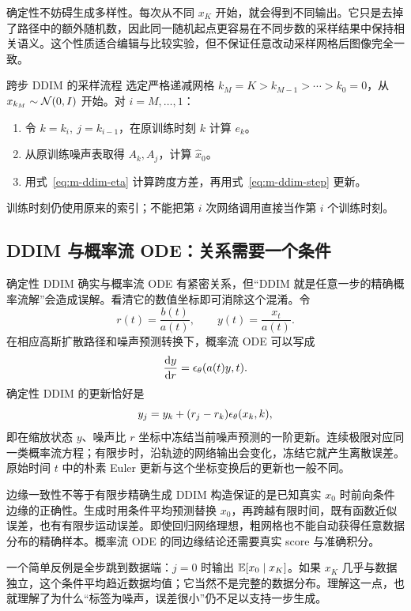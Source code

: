 确定性不妨碍生成多样性。每次从不同 $x_K$ 开始，就会得到不同输出。它只是去掉了路径中的额外随机数，因此同一随机起点更容易在不同步数的采样结果中保持相关语义。这个性质适合编辑与比较实验，但不保证任意改动采样网格后图像完全一致。

\begin{examplebox}{跨步 DDIM 的采样流程}
选定严格递减网格 $k_M=K>k_{M-1}>\cdots>k_0=0$，从
$x_{k_M}\sim\mathcal{N}(0,I)$ 开始。对 $i=M,\ldots,1$：
\begin{enumerate}[leftmargin=*,itemsep=2pt]
\item 令 $k=k_i,\ j=k_{i-1}$，在原训练时刻 $k$ 计算 $e_k$。
\item 从原训练噪声表取得 $A_k,A_j$，计算 $\widehat x_0$。
\item 用式~\eqref{eq:m-ddim-eta} 计算跨度方差，再用式~\eqref{eq:m-ddim-step} 更新。
\end{enumerate}
训练时刻仍使用原来的索引；不能把第 $i$ 次网络调用直接当作第 $i$ 个训练时刻。
\end{examplebox}

\subsection{DDIM 与概率流 ODE：关系需要一个条件}

确定性 DDIM 确实与概率流 ODE 有紧密关系，但“DDIM 就是任意一步的精确概率流解”会造成误解。看清它的数值坐标即可消除这个混淆。令
\[
 r(t)=\frac{b(t)}{a(t)},\qquad y(t)=\frac{x_t}{a(t)}.
\]
在相应高斯扩散路径和噪声预测转换下，概率流 ODE 可以写成
\begin{equation}
\frac{\mathop{}\!\mathrm{d} y}{\mathop{}\!\mathrm{d} r}=\epsilon_\theta(a(t)y,t).
\label{eq:m-ddim-rescaled-ode}
\end{equation}
确定性 DDIM 的更新恰好是
\[
 y_j=y_k+(r_j-r_k)\epsilon_\theta(x_k,k),
\]
即在缩放状态 $y$、噪声比 $r$ 坐标中冻结当前噪声预测的一阶更新。连续极限对应同一类概率流方程；有限步时，沿轨迹的网络输出会变化，冻结它就产生离散误差。原始时间 $t$ 中的朴素 Euler 更新与这个坐标变换后的更新也一般不同。

\begin{cautionbox}{边缘一致性不等于有限步精确生成}
DDIM 构造保证的是已知真实 $x_0$ 时前向条件边缘的正确性。生成时用条件平均预测替换 $x_0$，再跨越有限时间，既有函数近似误差，也有有限步运动误差。即使回归网络理想，粗网格也不能自动获得任意数据分布的精确样本。概率流 ODE 的同边缘结论还需要真实 score 与准确积分。
\end{cautionbox}

一个简单反例是全步跳到数据端：$j=0$ 时输出 $\mathbb{E}[x_0\mid x_K]$。如果 $x_K$ 几乎与数据独立，这个条件平均趋近数据均值；它当然不是完整的数据分布。理解这一点，也就理解了为什么“标签为噪声，误差很小”仍不足以支持一步生成。

